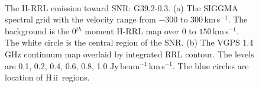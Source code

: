 \documentclass[manuscript]{aastex61}
\newcommand{\hii}{{\rm H\,}{{\sc ii}}}
\newcommand{\kms}{\,km\,s$^{-1}$}
\begin{document}
\begin{figure}[H]
	\centering
	\\
	\caption{The H-RRL emission toward SNR: G39.2-0.3.
	(a) The SIGGMA spectral grid with the velocity range from $-300$ to $300$\kms.
	The background is the 0$^{th}$ moment H-RRL map over $0$ to $150$\kms.
	The white circle is the central region of the SNR.
	(b) The VGPS 1.4 GHz continuum map overlaid by integrated RRL contour.
	The levels are 0.1, 0.2, 0.4, 0.6, 0.8, 1.0 Jy\,beam$^{-1}$\kms.
	The blue circles are location of \hii\ regions.
	}
	\label{fig_snr-g392}
\end{figure}
\end{document}
